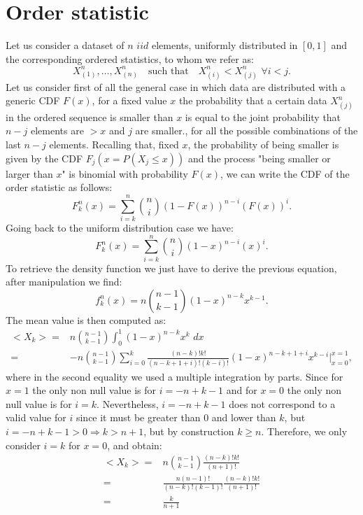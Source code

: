 \documentclass[twoside,onecolumn]{article}
\theoremstyle{definition}
\begin{document}
\section{Order statistic}
Let us consider a dataset of $n$ $iid$ elements, uniformly distributed in $[0,1]$ and the corresponding ordered statistics, to whom we refer as:
\begin{equation}
X_{(1)}^n, \dots, X_{(n)}^n \quad \text{such that} \quad X_{(i)}^n< X_{(j)}^n\,\, \forall i<j.
\end{equation}
Let us consider first of all the general case in which data are distributed with a generic CDF $F(x)$, for a fixed value $x$ the probability that a certain data $X_{(j)}^n$ in the ordered sequence is smaller than $x$ is equal to the joint probability that $n − j$ elements are $> x$ and  $j$ are smaller., for all the possible combinations of  the last $n − j$ elements. Recalling that, fixed $x$, the probability of being smaller is given by the CDF $F_j(x= P(X_j\leq x))$ and the process "being smaller or larger than $x$" is binomial with probability $F(x)$, we can write the CDF of the order statistic as follows:
\begin{equation}
F_k^n (x)=\sum_{i=k}^{n}\binom{n}{i}(1-F(x))^{n-i}(F(x))^i.
\end{equation}
Going back to the uniform distribution case we have:
\begin{equation}
F_k^n (x)=\sum_{i=k}^{n}\binom{n}{i}(1-x)^{n-i}(x)^i.
\end{equation}
To retrieve the density function we just have to derive the previous equation, after manipulation we find:
\begin{equation}
f_k^n(x)= n\binom{n-1}{k-1}(1-x)^{n-k}x^{k-1}.
\end{equation}
The mean value is then computed as:
\begin{equation}\begin{split}
<X_{k}>=& n\binom{n-1}{k-1} \int_0^1(1-x)^{n-k}x^{k} \,\, dx \\
=& - n\binom{n-1}{k-1} \sum_{i=0}^k \frac{(n-k)! k!}{(n-k+1+i)! (k-i)!}(1-x)^{n-k+1+i}x^{k-i}\Big|_{x=0}^{x=1},
\end{split}\end{equation}
where in the second equality we used a multiple integration by parts. Since for $x=1$ the only non null value is for $i=-n+k-1$ and for $x=0$ the only non null value is for $i=k$. Nevertheless, $i=-n+k-1$ does not correspond to a valid value for $i$ since it must be greater than 0 and lower than $k$, but  $i=-n+k-1>0 \Rightarrow k>n+1$, but by construction $k\geq n$. Therefore, we only consider $i=k$ for $x=0$, and obtain:
\begin{equation}\begin{split}
<X_{k}>=&n\binom{n-1}{k-1}  \frac{(n-k)! k!}{(n+1)! }\\
=&\frac{n(n-1)! }{(n-k)! (k-1)!} \frac{(n-k)! k!}{(n+1)! }\\
=& \frac{k}{n+1}
\end{split}\end{equation}
\end{document}
